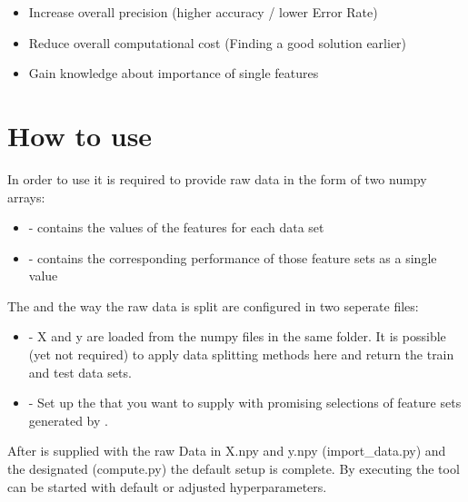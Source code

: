 \documentclass[letterpaper,10pt,english]{sphinxmanual}
\begin{document}
\begin{itemize}
\item {} 
Increase overall precision (higher accuracy / lower Error Rate)

\item {} 
Reduce overall computational cost (Finding a good solution earlier)

\item {} 
Gain knowledge about importance of single features

\end{itemize}


\section{How to use}
\label{\detokenize{index:how-to-use}}
In order to use  it is required to provide raw data in the form of two numpy arrays:
\begin{itemize}
\item {} 
 - contains the values of the features for each data set

\item {} 
 - contains the corresponding performance of those feature sets as a single value

\end{itemize}

The {\hyperref[\detokenize{Overview:mla}]{}} and the way the raw data is split are configured in two seperate files:
\begin{itemize}
\item {} 
{\hyperref[\detokenize{Importing_Data:import-data}]{}} - X and y are loaded from the numpy files in the same folder. 
It is possible (yet not required) to apply data splitting methods here and return the train and test data sets.

\item {} 
{\hyperref[\detokenize{Generate_Database:compute}]{}} - Set up the {\hyperref[\detokenize{Overview:mla}]{}} that you want to supply with promising selections of 
feature sets generated by .

\end{itemize}

After  is supplied with the raw Data in X.npy and y.npy (import\_data.py)
and the designated {\hyperref[\detokenize{Overview:mla}]{}} (compute.py) the default setup is complete. 
By executing  the tool can be started with default or adjusted hyperparameters.
\end{document}
